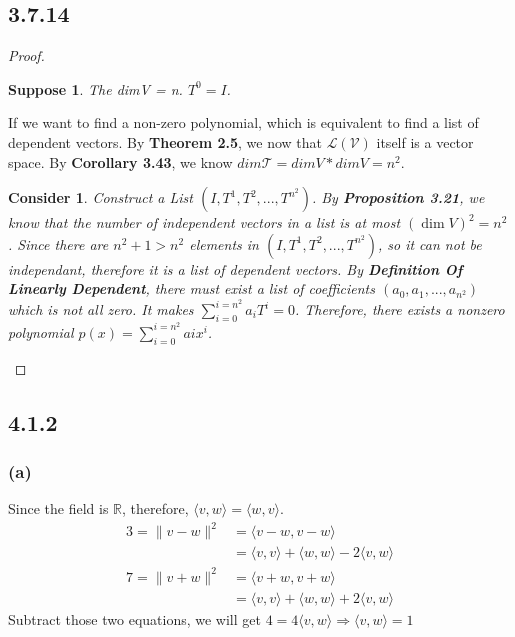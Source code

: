 \documentclass{article}
\newtheorem*{consider}{Consider}
\newtheorem*{suppose}{Suppose}
\newtheorem*{proof}{Proof}
\begin{document}
\subsection*{3.7.14}
\begin{proof}
    \begin{suppose}
        The dimV = n. $T^0 = I$.
    \end{suppose}
    If we want to find a non-zero polynomial, which is equivalent to find a list of dependent vectors. By \textbf{Theorem 2.5}, we now that $\mathcal{L(V)}$ itself is a
    vector space. By \textbf{Corollary 3.43}, we know $dim{\mathcal{T}} = dim{V} * dim{V} = n^2$. 
    \begin{consider}
        Construct a List $(I, T^1, T^2, ..., T^{n^2})$. By \textbf{Proposition 3.21}, we know that the number of independent vectors in a list is at most $(\dim{V})^2 = n^2$ .
        Since there are $n^2 + 1 > n^2$ elements in $(I, T^1, T^2, ..., T^{n^2})$, so it can not be independant, therefore it is a list of dependent vectors. 
        By \textbf{Definition Of Linearly Dependent}, there must exist
        a list of coefficients $(a_0, a_1, ..., a_{n^2})$ which is not all zero. It makes $\sum_{i = 0}^{i=n^2} a_iT^i = 0$. Therefore, there exists
        a nonzero polynomial $p(x) = \sum_{i = 0}^{i=n^2} aix^i$.
    \end{consider}
\end{proof}
\subsection*{4.1.2}
\subsubsection*{(a)}
Since the field is $\mathbb{R}$, therefore, $\langle{v}, {w} \rangle = \langle{w}, {v} \rangle $.
\begin{equation*}
    \begin{split}
        3 = \|v - w\|^2 &= \langle{v-w}, {v-w} \rangle \\
                        &= \langle{v}, {v} \rangle + \langle{w}, {w} \rangle - 2\langle{v}, {w} \rangle\\
        7 = \|v + w\|^2 &= \langle{v+w}, {v+w} \rangle \\
                        &= \langle{v}, {v} \rangle + \langle{w}, {w} \rangle + 2\langle{v}, {w} \rangle
    \end{split}
\end{equation*}
Subtract those two equations, we will get $4 = 4\langle{v}, {w} \rangle \Rightarrow \langle{v}, {w} \rangle= 1$
\end{document}

